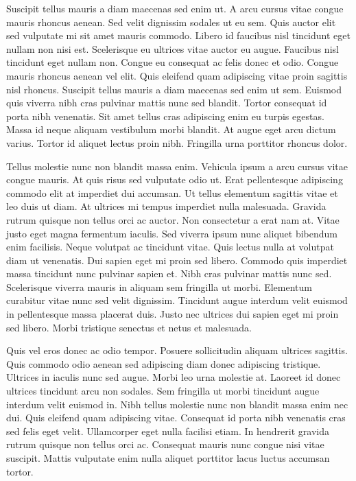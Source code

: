\documentclass[11pt,a4paper]{article}
\begin{document}
Suscipit tellus mauris a diam maecenas sed enim ut. A arcu cursus vitae congue mauris rhoncus aenean. Sed velit dignissim sodales ut eu sem. Quis auctor elit sed vulputate mi sit amet mauris commodo. Libero id faucibus nisl tincidunt eget nullam non nisi est. Scelerisque eu ultrices vitae auctor eu augue. Faucibus nisl tincidunt eget nullam non. Congue eu consequat ac felis donec et odio. Congue mauris rhoncus aenean vel elit. Quis eleifend quam adipiscing vitae proin sagittis nisl rhoncus. Suscipit tellus mauris a diam maecenas sed enim ut sem. Euismod quis viverra nibh cras pulvinar mattis nunc sed blandit. Tortor consequat id porta nibh venenatis. Sit amet tellus cras adipiscing enim eu turpis egestas. Massa id neque aliquam vestibulum morbi blandit. At augue eget arcu dictum varius. Tortor id aliquet lectus proin nibh. Fringilla urna porttitor rhoncus dolor.

Tellus molestie nunc non blandit massa enim. Vehicula ipsum a arcu cursus vitae congue mauris. At quis risus sed vulputate odio ut. Erat pellentesque adipiscing commodo elit at imperdiet dui accumsan. Ut tellus elementum sagittis vitae et leo duis ut diam. At ultrices mi tempus imperdiet nulla malesuada. Gravida rutrum quisque non tellus orci ac auctor. Non consectetur a erat nam at. Vitae justo eget magna fermentum iaculis. Sed viverra ipsum nunc aliquet bibendum enim facilisis. Neque volutpat ac tincidunt vitae. Quis lectus nulla at volutpat diam ut venenatis. Dui sapien eget mi proin sed libero. Commodo quis imperdiet massa tincidunt nunc pulvinar sapien et. Nibh cras pulvinar mattis nunc sed. Scelerisque viverra mauris in aliquam sem fringilla ut morbi. Elementum curabitur vitae nunc sed velit dignissim. Tincidunt augue interdum velit euismod in pellentesque massa placerat duis. Justo nec ultrices dui sapien eget mi proin sed libero. Morbi tristique senectus et netus et malesuada.

Quis vel eros donec ac odio tempor. Posuere sollicitudin aliquam ultrices sagittis. Quis commodo odio aenean sed adipiscing diam donec adipiscing tristique. Ultrices in iaculis nunc sed augue. Morbi leo urna molestie at. Laoreet id donec ultrices tincidunt arcu non sodales. Sem fringilla ut morbi tincidunt augue interdum velit euismod in. Nibh tellus molestie nunc non blandit massa enim nec dui. Quis eleifend quam adipiscing vitae. Consequat id porta nibh venenatis cras sed felis eget velit. Ullamcorper eget nulla facilisi etiam. In hendrerit gravida rutrum quisque non tellus orci ac. Consequat mauris nunc congue nisi vitae suscipit. Mattis vulputate enim nulla aliquet porttitor lacus luctus accumsan tortor.
\end{document}

